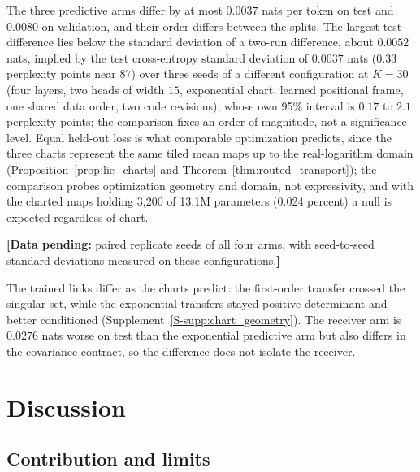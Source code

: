 \documentclass[twoside,11pt]{article}
\providecommand{\datapending}[1]{{\color{red!60!black}\textbf{[Data pending:} #1\textbf{]}}}
\begin{document}
The three predictive arms differ by at most $0.0037$ nats per token on test and $0.0080$ on validation, and their order differs between the splits. The largest test difference lies below the standard deviation of a two-run difference, about $0.0052$ nats, implied by the test cross-entropy standard deviation of $0.0037$ nats ($0.33$ perplexity points near $87$) over three seeds of a different configuration at $K=30$ (four layers, two heads of width $15$, exponential chart, learned positional frame, one shared data order, two code revisions), %
whose own 95\% interval is $0.17$ to $2.1$ perplexity points; %
the comparison fixes an order of magnitude, not a significance level. Equal held-out loss is what comparable optimization predicts, since the three charts represent the same tiled mean maps up to the real-logarithm domain (Proposition~\ref{prop:lie_charts} and Theorem~\ref{thm:routed_transport}); the comparison probes optimization geometry and domain, not expressivity, and with the charted maps holding 3,200 of 13.1M parameters (0.024 percent) a null is expected regardless of chart.

\datapending{paired replicate seeds of all four arms, with seed-to-seed standard deviations measured on these configurations.} %

The trained links differ as the charts predict: the first-order transfer crossed the singular set, while the exponential transfers stayed positive-determinant and better conditioned (Supplement~\ref{S-supp:chart_geometry}). The receiver arm is $0.0276$ nats worse on test than the exponential predictive arm but also differs in the covariance contract, so the difference does not isolate the receiver.


\section{Discussion}
\label{sec:discussion}

\subsection{Contribution and limits}
\label{sec:limitations}
\end{document}
